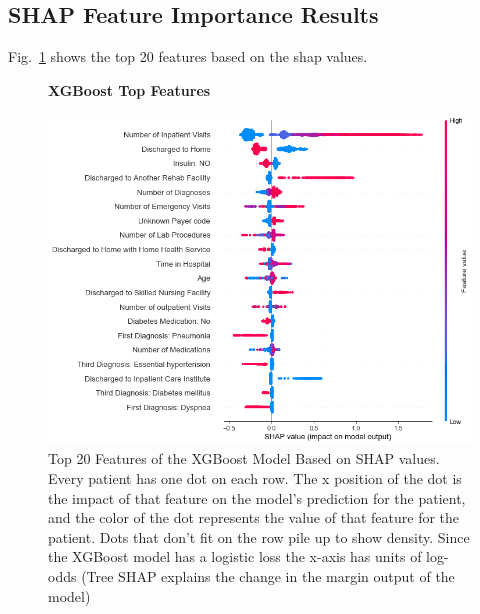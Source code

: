 \documentclass[letterpaper, 10 pt, conference]{ieeeconf}  %
\begin{document}
 \subsection{SHAP Feature Importance Results}
 Fig.~\ref{shapfeatures} shows the top 20 features based on the shap values.
 \begin{figure}[!hbt]
\centering
\textbf{XGBoost Top Features}\par\medskip
\includegraphics[width=1\columnwidth]{shapfeatures.png}
\caption{Top 20 Features of the XGBoost Model Based on SHAP values. Every patient has one dot on each row. The x position of the dot is the impact of that feature on the model’s prediction for the patient, and the color of the dot represents the value of that feature for the patient. Dots that don’t fit on the row pile up to show density. Since the XGBoost model has a logistic loss the x-axis has units of log-odds (Tree SHAP explains the change in the margin output of the model)}
\label{shapfeatures}
\end{figure}\\
\end{document}
